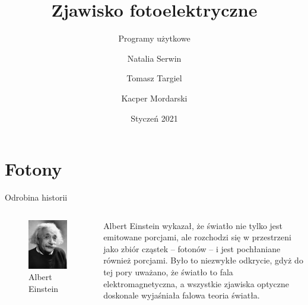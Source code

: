 \documentclass{cubeamer}
\title{Zjawisko fotoelektryczne}
\subtitle{Programy użytkowe}
\author[Natalia S. \and Tomasz T. \and Kacper M.]{Natalia Serwin \and Tomasz Targiel \and Kacper Mordarski}
\date{Styczeń 2021}
\institute[Uniwersytet Wrocławski]{Fizyka komputerowa, Wydział Fizyki i Astronomii, Uniwersytet Wrocławski}
\begin{document}
	\maketitle

	\cutoc

	\section{Fotony}

	\begin{frame}{Odrobina historii}
		\begin{columns}
			\begin{column}{0.4\textwidth}
				\begin{figure}
					\centering
					\includegraphics[height=0.7\textheight]{img/albert.jpeg}
					\caption{Albert Einstein}
				\end{figure}
			\end{column}
			\begin{column}{0.6\textwidth}
				Albert Einstein wykazał, że światło nie tylko jest emitowane porcjami, ale
				rozchodzi się w przestrzeni jako zbiór cząstek – fotonów – i jest pochłaniane
				również porcjami.
				\newline
				\newline
				Było to niezwykłe odkrycie, gdyż do tej pory uważano, że światło to fala
				elektromagnetyczna, a wszystkie zjawiska optyczne doskonale wyjaśniała falowa
				teoria światła.
			\end{column}
		\end{columns}
	\end{frame}
\end{document}
